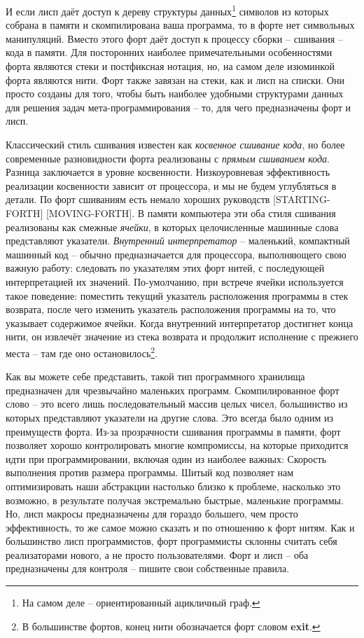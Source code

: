 И если лисп даёт доступ к дереву структуры данных\footnote{На самом деле -- ориентированный ацикличный граф.} символов из которых собрана в памяти и скомпилирована ваша программа, то в форте нет символьных манипуляций. Вместо этого форт даёт доступ к процессу сборки -- сшивания -- кода в памяти. Для посторонних наиболее примечательными особенностями форта являются стеки и постфиксная нотация, но, на самом деле изюминкой форта являются нити. Форт также завязан на стеки, как и лисп на списки. Они просто созданы для того, чтобы быть наиболее удобными структурами данных для решения задач мета-программирования -- то, для чего предназначены форт и лисп.

Классический стиль сшивания известен как \emph{косвенное сшивание кода}, но более современные разновидности форта реализованы с \emph{прямым сшиванием кода}. Разница заключается в уровне косвенности. Низкоуровневая эффективность реализации косвенности зависит от процессора, и мы не будем углубляться в детали. По форт сшиваниям есть немало хороших руководств [STARTING-FORTH] [MOVING-FORTH]. В памяти компьютера эти оба стиля сшивания реализованы как смежные \emph{ячейки}, в которых целочисленные машинные слова представляют указатели. \emph{Внутренний интерпретатор} -- маленький, компактный машинный код -- обычно предназначается для процессора, выполняющего свою важную работу: следовать по указателям этих форт нитей, с последующей интерпретацией их значений. По-умолчанию, при встрече ячейки используется такое поведение: поместить текущий указатель расположения программы в стек возврата, после чего изменить указатель расположения программы на то, что указывает содержимое ячейки. Когда внутренний интерпретатор достигнет конца нити, он извлечёт значение из стека возврата и продолжит исполнение с прежнего места -- там где оно остановилось\footnote{В большинстве фортов, конец нити обозначается форт словом \textbf{exit}.}.

Как вы можете себе представить, такой тип программного хранилища предназначен для чрезвычайно маленьких программ. Скомпилированное форт слово -- это всего лишь последовательный массив целых чисел, большинство из которых представляют указатели на другие слова. Это всегда было одним из преимуществ форта. Из-за прозрачности сшивания программы в памяти, форт позволяет хорошо контролировать многие компромиссы, на которые приходится идти при программировании, включая один из наиболее важных: Скорость выполнения против размера программы. Шитый код позволяет нам оптимизировать наши абстракции настолько близко к проблеме, насколько это возможно, в результате получая экстремально быстрые, маленькие программы. Но, лисп макросы предназначены для гораздо большего, чем просто эффективность, то же самое можно сказать и по отношению к форт нитям. Как и большинство лисп программистов, форт программисты склонны считать себя реализаторами нового, а не просто пользователями. Форт и лисп -- оба предназначены для контроля -- пишите свои собственные правила.

